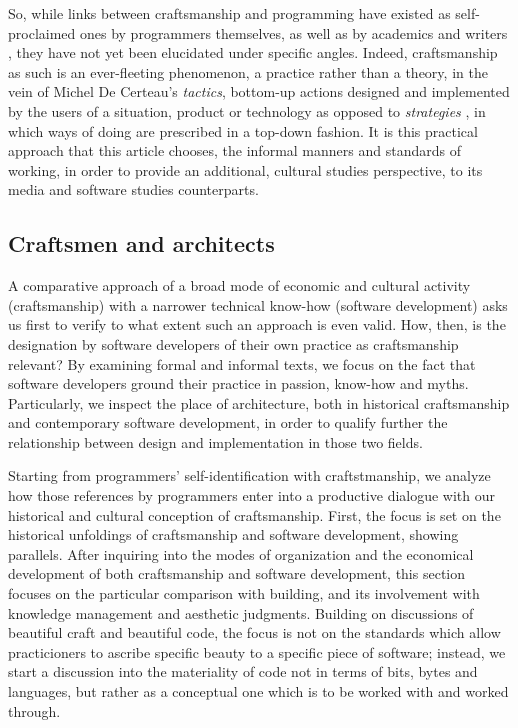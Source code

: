 So, while links between craftsmanship and programming have existed as self-proclaimed ones by programmers themselves, as well as by academics and writers  \citep{sennett_craftsman_2009,chandra_geek_2014}, they have not yet been elucidated under specific angles. Indeed, craftsmanship as such is an ever-fleeting phenomenon, a practice rather than a theory, in the vein of Michel De Certeau's \textit{tactics}, bottom-up actions designed and implemented by the users of a situation, product or technology as opposed to \textit{strategies} \citep{certeau_invention_1990}, in which ways of doing are prescribed in a top-down fashion. It is this practical approach that this article chooses, the informal manners and standards of working, in order to provide an additional, cultural studies perspective, to its media and software studies counterparts.

\subsection{Craftsmen and architects}

A comparative approach of a broad mode of economic and cultural activity (craftsmanship) with a narrower technical know-how (software development) asks us first to verify to what extent such an approach is even valid. How, then, is the designation by software developers of their own practice as craftsmanship relevant?  By examining formal and informal texts, we focus on the fact that software developers ground their practice in passion, know-how and myths. Particularly, we inspect the place of architecture, both in historical craftsmanship and contemporary software development, in order to qualify further the relationship between design and implementation in those two fields.

Starting from programmers' self-identification with craftstmanship, we analyze how those references by programmers enter into a productive dialogue with our historical and cultural conception of craftsmanship. First, the focus is set on the historical unfoldings of craftsmanship and software development, showing parallels. After inquiring into the modes of organization and the economical development of both craftsmanship and software development, this section focuses on the particular comparison with building, and its involvement with knowledge management and aesthetic judgments.  Building on discussions of beautiful craft and beautiful code, the focus is not on the standards which allow practicioners to ascribe specific beauty to a specific piece of software; instead, we start a discussion into the materiality of code not in terms of bits, bytes and languages, but rather as a conceptual one which is to be worked with and worked through.

